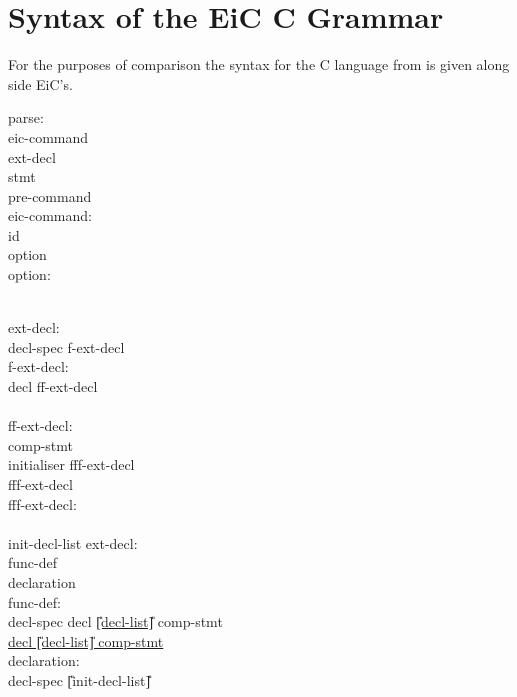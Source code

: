 \section{Syntax of the EiC C Grammar}
\label{sec:Cgrammar}

For the purposes of comparison the syntax for the C language from
\cite{kernighan-ritchie88} is given along side EiC's. 

\newpage
\footnotesize

\begin{center}

\PAIR
{
}
{
}

\PAIR 
{
parse:\\
\>  \T{:}  eic-command \\  
\>	ext-decl \\
\>	stmt  \\
\>      pre-command \\
eic-command: \\
\>	  id \\
\>	option \\
option: \\ 
\>	    \\ 
\> 	  
}
{

}


\PAIR
{
ext-decl:\\
\> decl-spec f-ext-decl \\
f-ext-decl: \\
\> 	decl ff-ext-decl \\
\>	\T{;} \\
ff-ext-decl: \\
\> 	comp-stmt \\
\>	\T{=} initialiser fff-ext-decl \\
\>	fff-ext-decl \\
fff-ext-decl: \\
\>	\T{;} \\
\>	\T{,} init-decl-list \T{;} 
}
{
ext-decl:\\
\> 	func-def \\
\> 	declaration \\ 
func-def: \\
\> decl-spec decl \underline{\U{[}decl-list\U{]}} comp-stmt \\
\> \underline{decl \U{[}decl-list\U{]} comp-stmt}  \\
declaration: \\
\> 	decl-spec \U{[}init-decl-list\U{]} \T{;}
}  	



\end{center}
